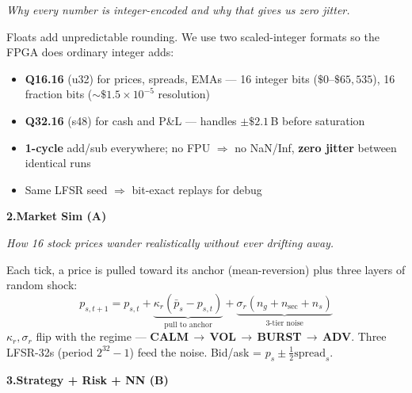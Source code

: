 \documentclass[final]{article}
\begin{document}
\begin{minipage}[t]{34.8in}
{{\begin{minipage}[t]{8.0in}
\vspace{0.04in}
{\fontsize{20}{26}\selectfont\itshape\color{uwgray}%
 Why every number is integer-encoded and why that gives us zero jitter.}

\vspace{0.06in}
Floats add unpredictable rounding. We use two scaled-integer
formats so the FPGA does ordinary integer adds:
\begin{itemize}[leftmargin=0.24in, itemsep=0.03in, labelsep=0.08in,
                topsep=0.04in]
  \item[\color{boardAcolor}\textbullet]
    \textbf{Q16.16} (u32) for prices, spreads, EMAs ---
    16 integer bits ($\$0$--$\$65{,}535$), 16 fraction bits
    ($\sim\!\$1.5\!\!\times\!\!10^{-5}$ resolution)
  \item[\color{boardAcolor}\textbullet]
    \textbf{Q32.16} (s48) for cash and P\&L ---
    handles \(\pm\$2.1\)\,B before saturation
  \item[\color{boardAcolor}\textbullet]
    \textbf{1-cycle} add/sub everywhere; no FPU \(\Rightarrow\)
    no NaN/Inf, \textbf{zero jitter} between identical runs
  \item[\color{boardAcolor}\textbullet]
    Same LFSR seed \(\Rightarrow\) bit-exact replays for debug
\end{itemize}
\end{minipage}\hfill
\begin{minipage}[t]{8.0in}
{\fontsize{24}{30}\selectfont\bfseries\color{boardAcolor}%
 2.\;Market Sim (A)}

\vspace{0.04in}
{\fontsize{20}{26}\selectfont\itshape\color{uwgray}%
 How 16 stock prices wander realistically without ever drifting away.}

\vspace{0.06in}
Each tick, a price is pulled toward its anchor (mean-reversion)
plus three layers of random shock:
\[
  p_{s,t+1} = p_{s,t}
   + \underbrace{\kappa_r(\bar{p}_s - p_{s,t})}_{\text{pull to anchor}}
   + \underbrace{\sigma_r(n_{g}+n_{\mathrm{sec}}+n_s)}_{\text{3-tier noise}}
\]
\(\kappa_r,\sigma_r\) flip with the regime ---
\textbf{CALM}\,\(\to\)\,\textbf{VOL}\,\(\to\)\,\textbf{BURST}\,\(\to\)\,\textbf{ADV}.
Three LFSR-32s (period \(2^{32}\!-\!1\)) feed the noise.
Bid/ask = \(p_s\!\pm\!\tfrac{1}{2}\mathrm{spread}_s\).
\end{minipage}\hfill
\begin{minipage}[t]{8.0in}
{\fontsize{24}{30}\selectfont\bfseries\color{boardBcolor}%
 3.\;Strategy + Risk + NN (B)}


\end{minipage}}}
\end{minipage}
\end{document}

